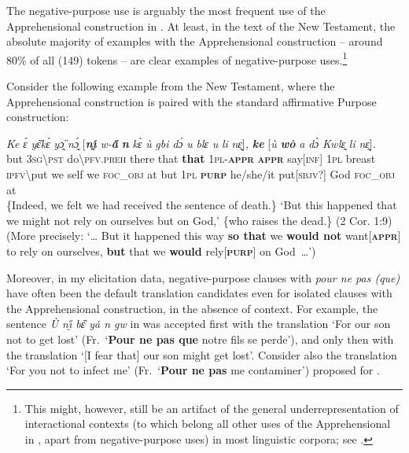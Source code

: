 \documentclass[output=paper,colorlinks,citecolor=brown]{langscibook}
\begin{document}
 The negative-purpose use is arguably the most frequent use of the Apprehensional construction in . At least, in the text of the New Testament, the absolute majority of examples with the Apprehensional construction -- around 80\% of all (149) tokens -- are clear examples of negative-purpose uses.\footnote{This might, however, still be an artifact of the general underrepresentation of interactional contexts (to which belong all other uses of the Apprehensional in , apart from negative-purpose uses) in most linguistic corpora; see \citet[259--260]{vuillermet2018}.}

Consider the following example from the New Testament, where the Apprehensional construction is paired with the standard affirmative Purpose construction:


\ea \label{ex:Fed65}
\gll \textit{Ke} \textit{ɛ́} \textit{yɛ̏kɛ́} \textit{yɔ̰̈} \textit{nɔ̰́} \textup{[}\textit{\textbf{nı̰́}} \textit{w-\textbf{a̋}} \textit{\textbf{n{\ù}}} \textit{kɛ̀} \textit{ù} \textit{gbi} \textit{dɔ́} \textit{u} \textit{blɛ} \textit{u} \textit{li} \textit{nɛ̰}\textup{]}\textit{,} \textit{\textbf{ke}} \textup{[}\textit{ù} \textit{\textbf{wò}} \textit{a} \textit{dɔ̀} \textit{Kwlɛ̰} \textit{li} \textit{nɛ̰}\textup{]}\textit{.} \\
but \textsc{3sg\backslash pst} do\backslash\textsc{pfv.preh} there that \textbf{that} \textsc{1pl-\textbf{appr}} \textsc{\textbf{appr}} say[\textsc{inf}] \textsc{1pl} breast \textsc{ipfv\backslash}put we self we \textsc{foc\_obj} at but \textsc{1pl} \textsc{\textbf{purp}} he/she/it put[\textsc{sbjv?}] God \textsc{foc\_obj} at \\
\glt \{Indeed, we felt we had received the sentence of death.\} `But this happened that we might not rely on ourselves but on God,' \{who raises the dead.\} (2 Cor. 1:9) \\
(More precisely: `{\dots} But it happened this way \textbf{so that} we \textbf{would not} want[\textbf{\textsc{appr}}] to rely on ourselves, \textbf{but} that we \textbf{would} rely[\textbf{\textsc{purp}}] on God~{\dots}')
\z

 Moreover, in my elicitation data,  negative-purpose clauses with \textit{pour ne pas (que)} have often been the default translation candidates even for isolated clauses with the Apprehensional construction, in the absence of context. For example, the sentence \textit{Ù nı̰̋ bɛ̏ yǎ n{\ù} gw{\à}} in  was accepted first with the translation `For our son not to get lost' (Fr.\ `\textbf{Pour ne pas que} notre fils se perde'), and only then with the translation `[I fear that] our son might get lost'. Consider also the translation `For you not to infect me' (Fr.\ `\textbf{Pour ne pas} me contaminer') proposed for .
\end{document}
